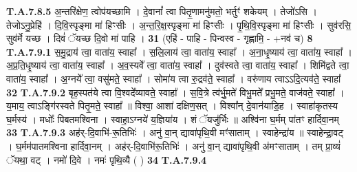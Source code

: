 \documentclass[17pt]{extarticle}
\begin{document}
                  \newline
                                                                  \textbf{ T.A.7.8.5} \newline
                  अ॒न्तरि॑क्षेण॒ त्वोप॑यच्छामि । दे॒वानां᳚ त्वा पितृ॒णामनु॑मतो॒ भर्तुꣳ॑ शकेयम् । तेजो॑ऽसि ।  तेजोऽनु॒प्रेहि॑ । दि॒वि॒स्पृङ्मा मा॑ हिꣳसीः ।  अ॒न्त॒रि॒क्ष॒स्पृङ्मा मा॑ हिꣳसीः । पृ॒थि॒वि॒स्पृङ्मा मा॑ हिꣳसीः ।  सुव॑रसि॒ सुव॑र्मे यच्छ ।  दिवं॑ ॅयच्छ दि॒वो मा॑ पाहि । \textbf{ 31} \newline
                  \newline
                                                        (एहि॑ - पाहि - पिन्वस्व - गृह्णामि॒ - +नव॑ च) \textbf{8} \newline \newline
                                \textbf{ T.A.7.9.1} \newline
                  स॒मु॒द्राय॑ त्वा॒ वाता॑य॒ स्वाहा᳚ । स॒लि॒लाय॑ त्वा॒ वाता॑य॒ स्वाहा᳚ । अ॒ना॒धृ॒ष्याय॑ त्वा॒ वाता॑य॒ स्वाहा᳚ । अ॒प्र॒ति॒धृ॒ष्याय॑ त्वा॒ वाता॑य॒ स्वाहा᳚ ।  अ॒व॒स्यवे᳚ त्वा॒ वाता॑य॒ स्वाहा᳚ । दुव॑स्वते त्वा॒ वाता॑य॒ स्वाहा᳚ । शिमि॑द्वते त्वा॒ वाता॑य॒ स्वाहा᳚ । अ॒ग्नये᳚ त्वा॒ वसु॑मते॒ स्वाहा᳚ ।  सोमा॑य त्वा रु॒द्रव॑ते॒ स्वाहा᳚ ।  वरु॑णाय त्वाऽऽदि॒त्यव॑ते॒ स्वाहा᳚ \textbf{ 32} \newline
                  \newline
                                                                  \textbf{ T.A.7.9.2} \newline
                  बृह॒स्पत॑ये त्वा वि॒श्वदे᳚व्यावते॒ स्वाहा᳚ ।  स॒वि॒त्रे त्व॑र्भु॒मते॑ विभु॒मते᳚ प्रभु॒मते॒ वाज॑वते॒ स्वाहा᳚ । य॒माय॒ त्वाऽङ्गि॑रस्वते पितृ॒मते॒ स्वाहा᳚ ॥ विश्वा॒ आशा॑ दक्षिण॒सत् । विश्वा᳚न् दे॒वान॑याडि॒ह । स्वाहा॑कृतस्य घ॒र्मस्य॑ । मधोः᳚ पिबतमश्विना ।  स्वाहा॒ऽग्नये॑ य॒ज्ञिया॑य । शं ॅयजु॑र्भिः ॥  अश्वि॑ना घ॒र्मम् पा॑तꣳ हार्दिवा॒नम् \textbf{ 33} \newline
                  \newline
                                                                  \textbf{ T.A.7.9.3} \newline
                  अह॑र्-दि॒वाभि॑-रू॒तिभिः॑ । अनु॑ वा॒न् द्यावा॑पृथि॒वी मꣳ॑साताम् । स्वाहेन्द्रा॑य ॥ स्वाहेन्द्रा॒वट् । घ॒र्मम॑पातमश्विना हार्दिवा॒नम् ।  अह॑र्-दि॒वाभि॑रू॒तिभिः॑ । अनु॑ वा॒न् द्यावा॑पृथि॒वी अ॑मꣳसाताम् । तम् प्रा॒व्यं॑ ॅयथा॒ वट् । नमो॑ दि॒वे । नमः॑ पृथि॒व्यै ( ) \textbf{ 34} \newline
                  \newline
                                                                  \textbf{ T.A.7.9.4} \newline
\end{document}
